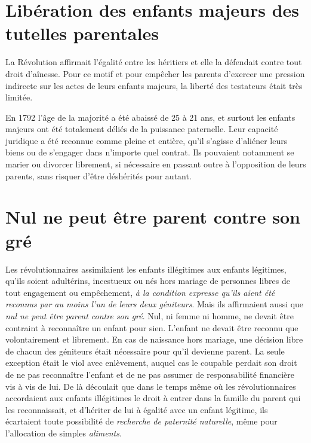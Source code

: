  


\section{Libération des enfants majeurs des tutelles parentales}

 La Révolution affirmait l'égalité entre les héritiers et elle la défendait contre tout droit d'aînesse. Pour ce motif et pour empêcher les parents d'exercer une pression indirecte sur les actes de leurs enfants majeurs, la liberté des testateurs était très limitée.
 
 En 1792 l'âge de la majorité a été abaissé de 25 à 21 ans, et surtout les enfants majeurs ont été totalement déliés de la puissance paternelle. Leur capacité juridique a été reconnue comme pleine et entière, qu'il s'agisse d'aliéner leurs biens ou de s'engager dans n'importe quel contrat. Ils pouvaient notamment se marier ou divorcer librement, si nécessaire en passant outre à l'opposition de leurs parents, sans risquer d'être déshérités pour autant. 

 


\section{Nul ne peut être parent contre son gré}

 Les révolutionnaires assimilaient les enfants illégitimes aux enfants légitimes, qu'ils soient adultérins, incestueux ou nés hors mariage de personnes libres de tout engagement ou empêchement, \emph{à la condition expresse qu'ils aient été reconnus par au moins l'un de leurs deux géniteurs}. 
 Mais ils affirmaient aussi que \emph{nul ne peut être parent contre son gré}. Nul, ni femme ni homme, ne devait être contraint à reconnaître un enfant pour sien. L'enfant ne devait être reconnu que volontairement et librement. En cas de naissance hors mariage, une décision libre de chacun des géniteurs était nécessaire pour qu'il devienne parent. La seule exception était le viol avec enlèvement, auquel cas le coupable perdait son droit de ne pas reconnaître l'enfant et de ne pas assumer de responsabilité financière vis à vis de lui. 
De là découlait que dans le temps même où les révolutionnaires accordaient aux enfants illégitimes le droit à entrer dans la famille du parent qui les reconnaissait, et d'hériter de lui à égalité avec un enfant légitime, ils écartaient toute possibilité de \emph{recherche de paternité naturelle}, même pour l'allocation de simples \emph{aliments}. 
 
